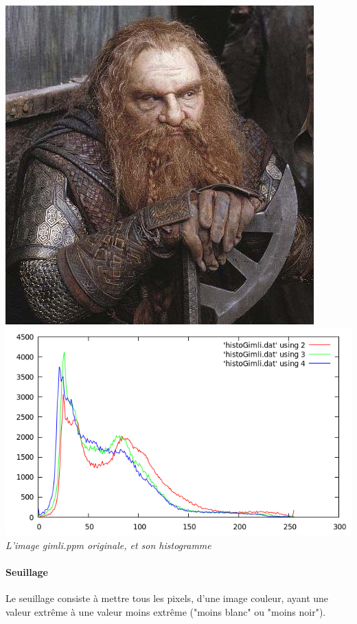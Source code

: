 \documentclass[a4paper,11pt]{article}
\begin{document}
\begin{center}
\includegraphics[scale=0.5]{gimli.png}
\includegraphics[scale=0.5]{histoGimli.png}\\
\textit{L'image gimli.ppm originale, et son histogramme}
\end{center}

\newpage
\paragraph{Seuillage} Le seuillage consiste à mettre tous les pixels, d'une image couleur, ayant une valeur extrême à une valeur moins extrême ("moins blanc" ou "moins noir").
\end{document}
